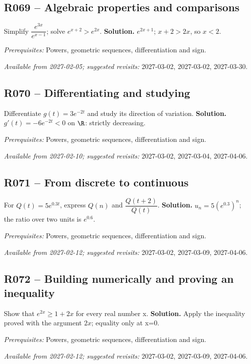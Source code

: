 \subsection*{R069 -- Algebraic properties and comparisons}\label{R069}
Simplify $\dfrac{e^{3x}}{e^{x-1}}$; solve $e^{x+2}>e^{2x}$.
\ifprof\textbf{Solution.} $e^{2x+1}$; $x+2>2x$, so $x<2$.\par\textit{Prerequisites:} Powers, geometric sequences, differentiation and sign.\par\textit{Available from 2027-02-05; suggested revisits:} 2027-03-02, 2027-03-02, 2027-03-30.\fi
{}\subsection*{R070 -- Differentiating and studying}\label{R070}
Differentiate $g(t)=3e^{-2t}$ and study its direction of variation.
\ifprof\textbf{Solution.} $g\prime(t)=-6e^{-2t}<0$ on $\R$: strictly decreasing.\par\textit{Prerequisites:} Powers, geometric sequences, differentiation and sign.\par\textit{Available from 2027-02-10; suggested revisits:} 2027-03-02, 2027-03-04, 2027-04-06.\fi
{}\subsection*{R071 -- From discrete to continuous}\label{R071}
For $Q(t)=5e^{0.3t}$, express $Q(n)$ and $\dfrac{Q(t+2)}{Q(t)}$.
\ifprof\textbf{Solution.} $u_n=5(e^{0.3})^n$; the ratio over two units is $e^{0.6}$.\par\textit{Prerequisites:} Powers, geometric sequences, differentiation and sign.\par\textit{Available from 2027-02-12; suggested revisits:} 2027-03-02, 2027-03-09, 2027-04-06.\fi
{}\subsection*{R072 -- Building numerically and proving an inequality}\label{R072}
Show that $e^{2x}\geq1+2x$ for every real number x.
\ifprof\textbf{Solution.} Apply the inequality proved with the argument $2x$; equality only at x=0.\par\textit{Prerequisites:} Powers, geometric sequences, differentiation and sign.\par\textit{Available from 2027-02-12; suggested revisits:} 2027-03-02, 2027-03-09, 2027-04-06.\fi

